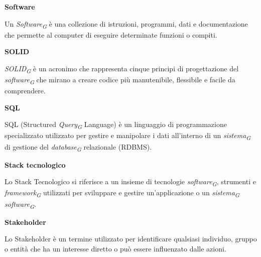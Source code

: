 \documentclass{article}
\begin{document}
\vspace{0.4cm}

\textbf{Software}

\vspace{0.1cm}

Un \textit{Software}\textsubscript{\textit{G}} è una collezione di istruzioni, programmi, dati e documentazione che permette al computer di eseguire determinate funzioni o compiti.

\pagebreak

\textbf{SOLID}

\vspace{0.1cm}

\textit{SOLID}\textsubscript{\textit{G}} è un acronimo che rappresenta cinque principi di progettazione del \textit{software}\textsubscript{\textit{G}} che mirano a creare codice più manutenibile, flessibile e facile da comprendere.

\vspace{0.4cm}

\textbf{SQL}

\vspace{0.1cm}

SQL (Structured \textit{Query}\textsubscript{\textit{G}} Language) è un linguaggio di programmazione specializzato utilizzato per gestire e manipolare i dati all'interno di un \textit{sistema}\textsubscript{\textit{G}} di gestione del \textit{database}\textsubscript{\textit{G}} relazionale (RDBMS).

\vspace{0.4cm}

\textbf{Stack tecnologico}

\vspace{0.1cm}

Lo Stack Tecnologico si riferisce a un insieme di tecnologie \textit{software}\textsubscript{\textit{G}}, strumenti e \textit{framework}\textsubscript{\textit{G}} utilizzati per sviluppare e gestire un'applicazione o un \textit{sistema}\textsubscript{\textit{G}} \textit{software}\textsubscript{\textit{G}}.

\vspace{0.4cm}

\textbf{Stakeholder}

\vspace{0.1cm}

Lo Stakeholder è un termine utilizzato per identificare qualsiasi individuo, gruppo o entità che ha un interesse diretto o può essere influenzato dalle azioni.
\end{document}
